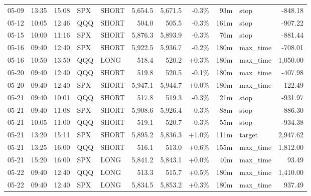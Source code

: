 \documentclass[11pt,a4paper,twoside]{article}
\begin{document}
\begin{center}
\begin{longtable}{>{\color{txtmain}}l l l l l r r r r >{\color{txtmain}}l r}
05-09 & 13:35 & 15:08 & SPX & SHORT & 5,654.5 & 5,671.5 & \textcolor{lossred}{-0.3\%} & 93m & stop & \textcolor{lossred}{-848.18} \\
05-12 & 10:05 & 12:46 & QQQ & SHORT & 504.0 & 505.5 & \textcolor{lossred}{-0.3\%} & 161m & stop & \textcolor{lossred}{-907.22} \\
05-15 & 10:00 & 11:16 & SPX & SHORT & 5,876.3 & 5,893.9 & \textcolor{lossred}{-0.3\%} & 76m & stop & \textcolor{lossred}{-881.44} \\
05-16 & 09:40 & 12:40 & SPX & SHORT & 5,922.5 & 5,936.7 & \textcolor{lossred}{-0.2\%} & 180m & max\_time & \textcolor{lossred}{-708.01} \\
05-16 & 10:50 & 13:50 & QQQ & LONG & 518.4 & 520.2 & \textcolor{wingreen}{+0.3\%} & 180m & max\_time & \textcolor{wingreen}{1,050.00} \\
05-20 & 09:40 & 12:40 & QQQ & SHORT & 519.8 & 520.5 & \textcolor{lossred}{-0.1\%} & 180m & max\_time & \textcolor{lossred}{-407.98} \\
05-20 & 09:40 & 12:40 & SPX & SHORT & 5,947.1 & 5,944.7 & \textcolor{wingreen}{+0.0\%} & 180m & max\_time & \textcolor{wingreen}{122.49} \\
05-21 & 09:40 & 10:01 & QQQ & SHORT & 517.8 & 519.3 & \textcolor{lossred}{-0.3\%} & 21m & stop & \textcolor{lossred}{-931.97} \\
05-21 & 09:40 & 11:08 & SPX & SHORT & 5,908.6 & 5,926.4 & \textcolor{lossred}{-0.3\%} & 88m & stop & \textcolor{lossred}{-886.30} \\
05-21 & 10:05 & 11:00 & QQQ & SHORT & 519.1 & 520.7 & \textcolor{lossred}{-0.3\%} & 55m & stop & \textcolor{lossred}{-934.38} \\
05-21 & 13:20 & 15:11 & SPX & SHORT & 5,895.2 & 5,836.3 & \textcolor{wingreen}{+1.0\%} & 111m & target & \textcolor{wingreen}{2,947.62} \\
05-21 & 13:25 & 16:00 & QQQ & SHORT & 516.1 & 513.0 & \textcolor{wingreen}{+0.6\%} & 155m & max\_time & \textcolor{wingreen}{1,812.00} \\
05-21 & 15:20 & 16:00 & SPX & LONG & 5,841.2 & 5,843.1 & \textcolor{wingreen}{+0.0\%} & 40m & max\_time & \textcolor{wingreen}{93.49} \\
05-22 & 09:40 & 12:40 & QQQ & LONG & 513.3 & 515.7 & \textcolor{wingreen}{+0.5\%} & 180m & max\_time & \textcolor{wingreen}{1,410.00} \\
05-22 & 09:40 & 12:40 & SPX & LONG & 5,834.5 & 5,853.2 & \textcolor{wingreen}{+0.3\%} & 180m & max\_time & \textcolor{wingreen}{937.49} \\

\end{longtable}
\end{center}
\end{document}
